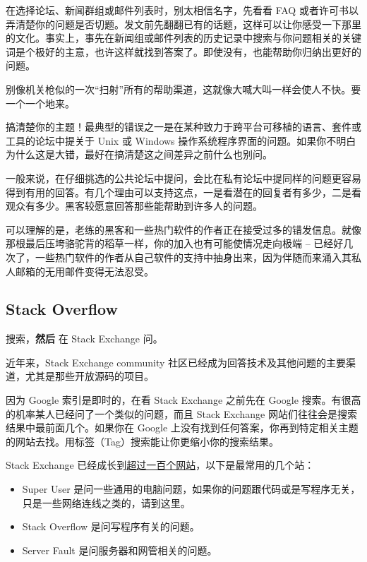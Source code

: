 \documentclass[titlepage]{article}
\begin{document}
在选择论坛、新闻群组或邮件列表时，别太相信名字，先看看 FAQ
或者许可书以弄清楚你的问题是否切题。发文前先翻翻已有的话题，这样可以让你感受一下那里的文化。事实上，事先在新闻组或邮件列表的历史记录中搜索与你问题相关的关键词是个极好的主意，也许这样就找到答案了。即使没有，也能帮助你归纳出更好的问题。

别像机关枪似的一次``扫射''所有的帮助渠道，这就像大喊大叫一样会使人不快。要一个一个地来。

搞清楚你的主题！最典型的错误之一是在某种致力于跨平台可移植的语言、套件或工具的论坛中提关于
Unix 或 Windows
操作系统程序界面的问题。如果你不明白为什么这是大错，最好在搞清楚这之间差异之前什么也别问。

一般来说，在仔细挑选的公共论坛中提问，会比在私有论坛中提同样的问题更容易得到有用的回答。有几个理由可以支持这点，一是看潜在的回复者有多少，二是看观众有多少。黑客较愿意回答那些能帮助到许多人的问题。

可以理解的是，老练的黑客和一些热门软件的作者正在接受过多的错发信息。就像那根最后压垮骆驼背的稻草一样，你的加入也有可能使情况走向极端
--
已经好几次了，一些热门软件的作者从自己软件的支持中抽身出来，因为伴随而来涌入其私人邮箱的无用邮件变得无法忍受。

\hypertarget{stack-overflow}{\subsection{Stack
Overflow}\label{stack-overflow}}

搜索，\textbf{然后} 在 Stack Exchange 问。

近年来，Stack Exchange community
社区已经成为回答技术及其他问题的主要渠道，尤其是那些开放源码的项目。

因为 Google 索引是即时的，在看 Stack Exchange 之前先在 Google
搜索。有很高的机率某人已经问了一个类似的问题，而且 Stack Exchange
网站们往往会是搜索结果中最前面几个。如果你在 Google
上没有找到任何答案，你再到特定相关主题的网站去找。用标签（Tag）搜索能让你更缩小你的搜索结果。

Stack Exchange
已经成长到\href{http://stackexchange.com/sites}{超过一百个网站}，以下是最常用的几个站：

\begin{itemize}

\item
  Super User
  是问一些通用的电脑问题，如果你的问题跟代码或是写程序无关，只是一些网络连线之类的，请到这里。
\item
  Stack Overflow 是问写程序有关的问题。
\item
  Server Fault 是问服务器和网管相关的问题。
\end{itemize}
\end{document}

